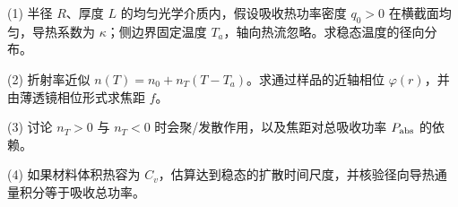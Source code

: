 (1) 半径 \(R\)、厚度 \(L\) 的均匀光学介质内，假设吸收热功率密度 \(q_0>0\) 在横截面均匀，导热系数为 \(\kappa\)；侧边界固定温度 \(T_a\)，轴向热流忽略。求稳态温度的径向分布。

(2) 折射率近似 \(n(T)=n_0+n_T(T-T_a)\)。求通过样品的近轴相位 \(\varphi(r)\)，并由薄透镜相位形式求焦距 \(f\)。

(3) 讨论 \(n_T>0\) 与 \(n_T<0\) 时会聚/发散作用，以及焦距对总吸收功率 \(P_{\rm abs}\) 的依赖。

(4) 如果材料体积热容为 \(C_v\)，估算达到稳态的扩散时间尺度，并核验径向导热通量积分等于吸收总功率。
